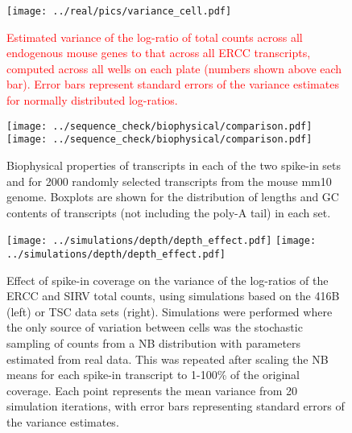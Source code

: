 \documentclass{article}
\newcommand\revised[1]{\textcolor{red}{#1}}
\begin{document}
\begin{figure}[btp]
    \begin{center}
        \texttt{[image: ../real/pics/variance\_cell.pdf]}
    \end{center}
    \caption{\revised{Estimated variance of the log-ratio of total counts across all endogenous mouse genes to that across all ERCC transcripts, computed across all wells on each plate (numbers shown above each bar).
        Error bars represent standard errors of the variance estimates for normally distributed log-ratios.
        }
    }
\end{figure}

\begin{figure}[btp]
    \begin{center}
        \texttt{[image: ../sequence\_check/biophysical/comparison.pdf]}
        \texttt{[image: ../sequence\_check/biophysical/comparison.pdf]}
    \end{center}
    \caption{Biophysical properties of transcripts in each of the two spike-in sets and for 2000 randomly selected transcripts from the mouse mm10 genome.
    Boxplots are shown for the distribution of lengths and GC contents of transcripts (not including the poly-A tail) in each set.
}
\end{figure}

\begin{figure}[btp]
    \begin{center}
        \texttt{[image: ../simulations/depth/depth\_effect.pdf]}
        \texttt{[image: ../simulations/depth/depth\_effect.pdf]}
    \end{center}
    \caption{Effect of spike-in coverage on the variance of the log-ratios of the ERCC and SIRV total counts, using simulations based on the 416B (left) or TSC data sets (right).
        Simulations were performed where the only source of variation between cells was the stochastic sampling of counts from a NB distribution with parameters estimated from real data.
        This was repeated after scaling the NB means for each spike-in transcript to 1-100\% of the original coverage. 
        Each point represents the mean variance from 20 simulation iterations, with error bars representing standard errors of the variance estimates.
    }
    \label{fig:sampledepth}
\end{figure}
\end{document}
